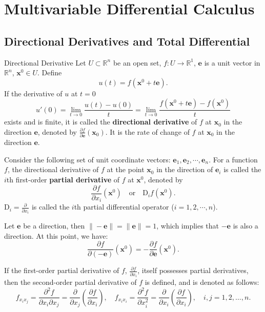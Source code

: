 \documentclass[11pt]{elegantbook}
\begin{document}
\chapter{Multivariable Differential Calculus}
\section{Directional Derivatives and Total Differential}
\begin{definition}{Directional Derivative}
    Let \(U\subset \mathbb{R}^n\) be an open set, \(f: U\to \mathbb{R}^{1}\),
    \(\boldsymbol{e}\) is a unit vector in \(\mathbb{R}^{n}\), \(\boldsymbol{x}^{0}\in U\). Define
    \[
    u(t) = f(\boldsymbol{x}^{0} + t\boldsymbol{e}).
    \]
    If the derivative of \(u\) at \(t=0\) 
    \[ 
        u'(0) = \lim_{t \to 0} \frac{u(t) - u(0)}{t} = 
        \lim_{t \to 0} \frac{f(\boldsymbol{x}^{0} + t\boldsymbol{e}) - f(\boldsymbol{x}^{0})}{t} 
    \] 
    exists and is finite, 
    it is called the \textbf{directional derivative} of \(f\) at \(\boldsymbol{x}_{0}\) in the direction \(\boldsymbol{e}\), 
    denoted by \(\frac{\partial f}{\partial \boldsymbol{e}}(\boldsymbol{x}_{0})\). 
    It is the rate of change of \(f\) at \(\boldsymbol{x}_{0}\) in the direction \(\boldsymbol{e}\).
\end{definition}

Consider the following set of unit coordinate vectors: \(\boldsymbol{e}_{1},\boldsymbol{e}_{2},\cdots,\boldsymbol{e}_{n}\).
For a function \( f \), the directional derivative of \( f \) at the point \( \boldsymbol{x}_{0} \) in the direction of \( \boldsymbol{e}_{i} \) 
is called the \( i \)th first-order \textbf{partial derivative} of \( f \) at \(\boldsymbol{x}^{0}\), denoted by
\[
\frac{\partial f}{\partial x_i}(\boldsymbol{x}^{0}) \quad \text{or} \quad \mathrm{D}_i f(\boldsymbol{x}^{0}).
\]
\( \mathrm{D}_i = \frac{\partial}{\partial x_i} \) is called the \( i \)th partial differential operator (\( i = 1, 2, \cdots, n \)).

\begin{note}
    Let \(\boldsymbol{e}\) be a direction, then \(\|-\boldsymbol{e}\| = \|\boldsymbol{e}\| = 1\), 
    which implies that \(-\boldsymbol{e}\) is also a direction. At this point, we have:
    \[
    \frac{\partial f}{\partial (-\boldsymbol{e})}(\boldsymbol{x}^{0}) = -\frac{\partial f}{\partial \boldsymbol{e}}(\boldsymbol{x}^{0}).
    \]
\end{note}

If the first-order partial derivative of \(f\), \(\frac{\partial f}{\partial x_i}\), 
itself possesses partial derivatives, then the second-order partial derivative of \(f\) is defined, 
and is denoted as follows:
\[
f_{x_i x_j} = \frac{\partial^2 f}{\partial x_i \partial x_j} = \frac{\partial}{\partial x_j} \left( \frac{\partial f}{\partial x_i} \right), 
\quad f_{x_i x_i} = \frac{\partial^2 f}{\partial x_i^2} = \frac{\partial}{\partial x_i} \left( \frac{\partial f}{\partial x_i} \right), 
\quad i, j = 1, 2, \dots, n.
\]
\end{document}
